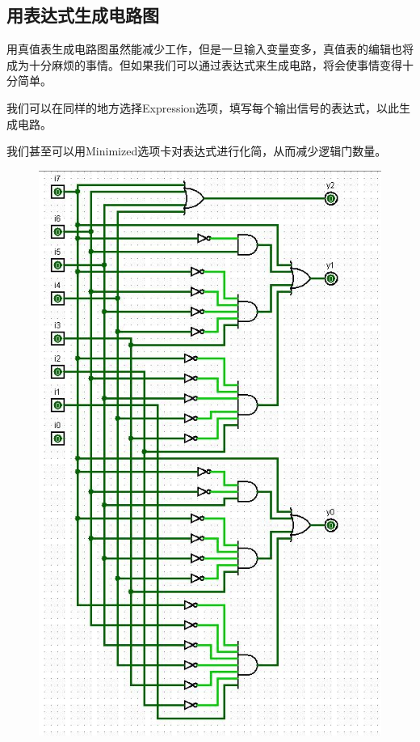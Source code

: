 \documentclass[UTF8]{article}
\begin{document}
	\subsection{用表达式生成电路图}
	用真值表生成电路图虽然能减少工作，但是一旦输入变量变多，真值表的编辑也将成为十分麻烦的事情。但如果我们可以通过表达式来生成电路，将会使事情变得十分简单。\par
	我们可以在同样的地方选择Expression选项，填写每个输出信号的表达式，以此生成电路。\par
	我们甚至可以用Minimized选项卡对表达式进行化简，从而减少逻辑门数量。\par
	\begin{figure}[H]
		\begin{minipage}[H]{0.45\linewidth}
			\centering
			\includegraphics[scale=0.45]{CurcuitGenerateByExpression_Complex.jpg}

\end{minipage}
\end{figure}
\end{document}
